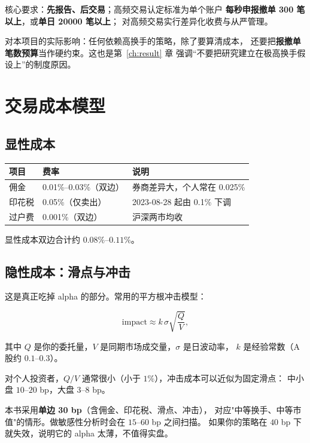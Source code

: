 核心要求：\textbf{先报告、后交易}；高频交易认定标准为单个账户
\textbf{每秒申报撤单 300 笔以上}，或\textbf{单日 20000 笔以上}；
对高频交易实行差异化收费与从严管理。

对本项目的实际影响：任何依赖高换手的策略，除了要算清成本，
还要把\textbf{报撤单笔数预算}当作硬约束。这也是第~\ref{ch:result} 章
强调“不要把研究建立在极高换手假设上”的制度原因。

\section{交易成本模型}

\subsection{显性成本}

\begin{center}
\begin{tabular}{@{}lll@{}}
\toprule
项目 & 费率 & 说明 \\
\midrule
佣金 & 0.01\%--0.03\%（双边） & 券商差异大，个人常在 0.025\% \\
印花税 & 0.05\%（仅卖出） & 2023-08-28 起由 0.1\% 下调 \\
过户费 & 0.001\%（双边） & 沪深两市均收 \\
\bottomrule
\end{tabular}
\end{center}

显性成本双边合计约 $0.08\%$--$0.11\%$。

\subsection{隐性成本：滑点与冲击}

这是真正吃掉 alpha 的部分。常用的平方根冲击模型：

\begin{equation}
  \text{impact} \approx k\,\sigma\sqrt{\frac{Q}{V}},
  \label{eq:impact}
\end{equation}

其中 $Q$ 是你的委托量，$V$ 是同期市场成交量，$\sigma$ 是日波动率，
$k$ 是经验常数（A 股约 $0.1$--$0.3$）。

对个人投资者，$Q/V$ 通常很小（小于 $1\%$），冲击成本可以近似为固定滑点：
中小盘 $10$--$20$ bp，大盘 $3$--$8$ bp。

\begin{keybox}[成本参数的合理取值]
本书采用\textbf{单边 30 bp}（含佣金、印花税、滑点、冲击），
对应"中等换手、中等市值"的情形。做敏感性分析时会在 $15$--$60$ bp 之间扫描。
如果你的策略在 $40$ bp 下就失效，说明它的 alpha 太薄，不值得实盘。
\end{keybox}

